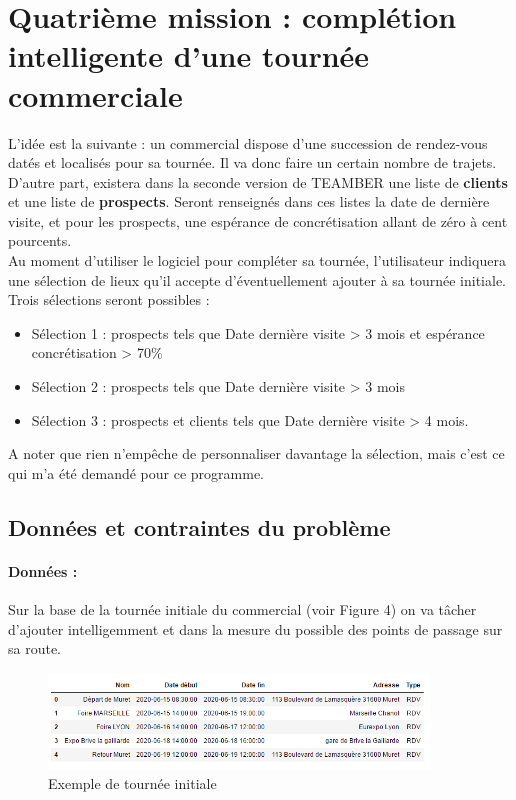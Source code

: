 \documentclass[12pt]{article}
\begin{document}
\section{Quatrième mission : complétion intelligente d'une tournée commerciale}
L'idée est la suivante : un commercial dispose d'une succession de rendez-vous datés et localisés pour sa tournée. Il va donc faire un certain nombre de trajets. \\
D'autre part, existera dans la seconde version de TEAMBER une liste de \textbf{clients} et une liste de \textbf{prospects}. Seront renseignés dans ces listes la date de dernière visite, et pour les prospects, une espérance de concrétisation allant de zéro à cent pourcents. \\
Au moment d'utiliser le logiciel pour compléter sa tournée, l'utilisateur indiquera une sélection de lieux qu'il accepte d'éventuellement ajouter à sa tournée initiale. Trois sélections seront possibles : 
\begin{itemize}
\item Sélection 1 : prospects tels que Date dernière visite > 3 mois et espérance concrétisation > 70\%
\item Sélection 2 : prospects tels que Date dernière visite > 3 mois
\item Sélection 3 : prospects et clients tels que Date dernière visite > 4 mois.
\end{itemize}
A noter que rien n'empêche de personnaliser davantage la sélection, mais c'est ce qui m'a été demandé pour ce programme.

\subsection{Données et contraintes du problème}
\paragraph{Données :}
Sur la base de la tournée initiale du commercial (voir Figure 4) on va tâcher d'ajouter intelligemment et dans la mesure du possible des points de passage sur sa route.


\begin{figure}[H]
\caption{Exemple de tournée initiale}
\begin{center}
\includegraphics[width=0.90\textwidth]{dfrdv}
\end{center}
\end{figure}
\end{document}
